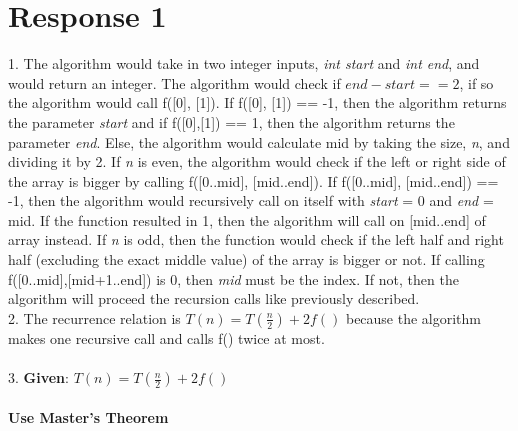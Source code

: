 \documentclass[12pt, a4paper]{article}
\begin{document}
\newenvironment{claim}[1]{\par\noindent\underline{Claim:}\space#1}{}
\newenvironment{basecase}[1]{\par\noindent\underline{Base Case:}\space#1}{}
\newenvironment{inductivehypothesis}[1]{\par\noindent\underline{Inductive Hypothesis:}\space#1}{}
\newenvironment{inductive}[1]{\par\noindent\underline{Inductive Case:}\space#1}{}
\newenvironment{guess}[1]{\par\noindent{Guess:}\space#1}{}
\newenvironment{prove}[1]{\par\noindent{Prove:}\space#1}{}
\maketitle
\section*{\centering Response 1}
    1. The algorithm would take in two integer inputs, \textit{int start} and \textit{int end}, and would return an integer.
    The algorithm would check if \(end - start == 2\), if so the algorithm would call f([0], [1]).
    If f([0], [1]) == -1, then the algorithm returns the parameter \textit{start} and if f([0],[1]) == 1, then the algorithm returns the parameter \textit{end}.
    Else, the algorithm would calculate mid by taking the size, \textit{n}, and dividing it by 2. 
    If \textit{n} is even, the algorithm would check if the left or right side of the array is bigger by calling f([0..mid], [mid..end]).
    If f([0..mid], [mid..end]) == -1, then the algorithm would recursively call on itself with \textit{start} = 0 and \textit{end} = mid.
    If the function resulted in 1, then the algorithm will call on [mid..end] of array instead.
    If \textit{n} is odd, then the function would check if the left half and right half (excluding the exact middle value) of the array is bigger or not.
    If calling f([0..mid],[mid+1..end]) is 0, then \textit{mid} must be the index. If not, then the algorithm will proceed the recursion calls like previously described.\\
    2. The recurrence relation is \(T(n) = T(\frac{n}{2}) + 2f()\) because the algorithm makes one recursive call and calls f() twice at most.\\
    \\
    3. \textbf{Given}: \(T(n) = T(\frac{n}{2}) + 2f()\)\\
    \\
    \textbf{Use Master's Theorem}\\
\end{document}
